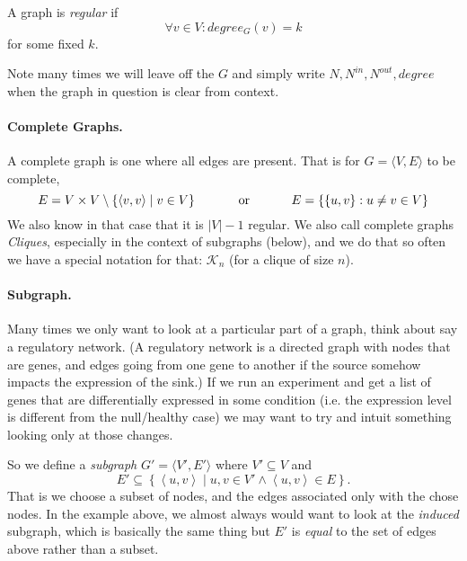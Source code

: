A graph is \emph{regular} if \[\forall v \in V : degree_G(v) = k\] for some fixed $k$. 

Note many times we will leave off the $G$ and simply write $N,N^{in},N^{out},degree$ when the graph in question is clear from context. 


\paragraph{Complete Graphs.}
A complete graph is one where all edges are present. 
That is for $G=\langle V, E\rangle$ to be complete, 
\[E= V\times V\setminus \left\{\left\langle v,v\right\rangle\mid v \in V\right\} \textnormal{\hspace{3em} or \hspace{3em}} E= \left\{\left\{u,v\right\} : u\ne v \in V\right\}\]
We also know in that case that it is $|V|-1$ regular.
We also call complete graphs \emph{Cliques}, especially in the context of subgraphs (below), 
and we do that so often we have a special notation for that: $\mathcal{K}_n$ (for a clique of size $n$). 


\paragraph{Subgraph.}
Many times we only want to look at a particular part of a graph, 
think about say a regulatory network.
(A regulatory network is a directed graph with nodes that are genes, 
and edges going from one gene to another if the source somehow impacts the expression of the sink.) 
If we run an experiment and get a list of genes that are differentially expressed in some condition 
(i.e. the expression level is different from the null/healthy case) 
we may want to try and intuit something looking only at those changes. 

So we define a \emph{subgraph} $G' = \langle V', E'\rangle$ where 
$V' \subseteq V$ and \[E' \subseteq \left\{\left\langle u,v\right\rangle \mid u,v\in V'\wedge \left\langle u,v\right\rangle \in E \right\}.\]
That is we choose a subset of nodes, and the edges associated only with the chose nodes. 
In the example above, we almost always would want to look at the \emph{induced} subgraph, which is basically the same thing
but $E'$ is \textit{equal} to the set of edges above rather than a subset.

